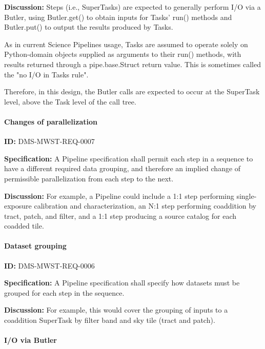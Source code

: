\documentclass[SE,toc,lsstdraft]{lsstdoc}
\begin{document}
\textbf{Discussion:}
Steps (i.e., SuperTasks) are expected to generally perform I/O via a Butler, using Butler.get() to obtain inputs for Tasks' run() methods and Butler.put() to output the results produced by Tasks.

As in current Science Pipelines usage, Tasks are assumed to operate solely on Python-domain objects supplied as arguments to their run() methods, with results returned through a pipe.base.Struct return value. This is sometimes called the "no I/O in Tasks rule".

Therefore, in this design, the Butler calls are expected to occur at the SuperTask level, above the Task level of the call tree.

\paragraph{Changes of parallelization}\hfill  %

\label{DMS-MWST-REQ-0007}
\textbf{ID:} DMS-MWST-REQ-0007

\textbf{Specification:}
A Pipeline specification shall permit each step in a sequence to have a different required data grouping, and therefore an implied change of permissible parallelization from each step to the next.

\textbf{Discussion:}
For example, a Pipeline could include a 1:1 step performing single-exposure calibration and characterization, an N:1 step performing coaddition by tract, patch, and filter, and a 1:1 step producing a source catalog for each coadded tile.

\paragraph{Dataset grouping}\hfill  %

\label{DMS-MWST-REQ-0006}
\textbf{ID:} DMS-MWST-REQ-0006

\textbf{Specification:}
A Pipeline specification shall specify how datasets must be grouped for each step in the sequence.

\textbf{Discussion:}
For example, this would cover the grouping of inputs to a coaddition SuperTask by filter band and sky tile (tract and patch).

\paragraph{I/O via Butler}\hfill  %
\end{document}
